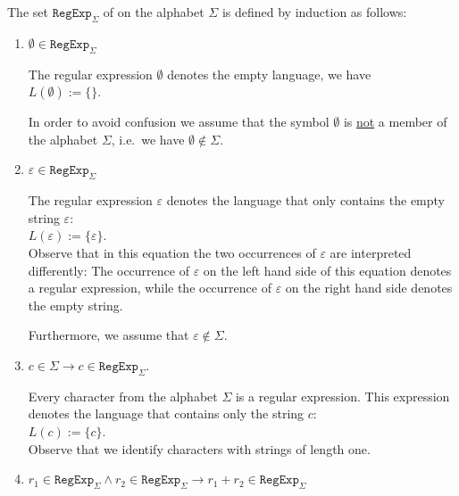 \begin{Definition}
  The set $\texttt{RegExp}_\Sigma$ of   on the alphabet  $\Sigma$ is defined
  by induction as follows:
  \begin{enumerate}
  \item $\emptyset \in \texttt{RegExp}_\Sigma$ \index{$\emptyset$}

        The regular expression $\emptyset$ denotes the empty language, we have
        \\[0.2cm]
        \hspace*{1.3cm}
        $L(\emptyset) := \{\}$.

        In order to avoid confusion we assume that the symbol $\emptyset$ is \underline{not} a member of the
        alphabet $\Sigma$, i.e.~we have $\emptyset \not\in \Sigma$.
  \item $\varepsilon \in \texttt{RegExp}_\Sigma$ \index{$\varepsilon$}

        The regular expression $\varepsilon$ denotes the language that only contains the empty
        string $\varepsilon$: 
        \\[0.2cm]
        \hspace*{1.3cm}
        $L(\varepsilon) := \{ \varepsilon \}$.
        \\[0.2cm]
        Observe that in this equation the two occurrences of $\varepsilon$ are interpreted differently:
        The occurrence of $\varepsilon$ on the left hand side of this equation denotes a regular
        expression, while the occurrence of $\varepsilon$ on the right hand side denotes the empty
        string.

        Furthermore, we assume that $\varepsilon \not\in \Sigma$.
  \item $c \in \Sigma \rightarrow c \in \texttt{RegExp}_\Sigma$.

        Every character from the alphabet $\Sigma$ is a regular expression.  This expression denotes
        the language that contains only the string $c$:
        \\[0.2cm]
        \hspace*{1.3cm}
        $L(c) := \{ c \}$.
        \\[0.2cm]
        Observe that we identify characters with strings of length one.
  \item $r_1 \in \texttt{RegExp}_\Sigma \wedge r_2 \in \texttt{RegExp}_\Sigma
         \rightarrow r_1 + r_2 \in \texttt{RegExp}_\Sigma$


\end{enumerate}
\end{Definition}

